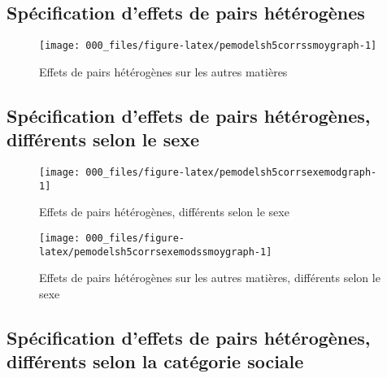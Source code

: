 \documentclass[
]{book}
\begin{document}
\hypertarget{pemodelsh5corrssmoy}{%
\subsection{Spécification d'effets de pairs hétérogènes}\label{pemodelsh5corrssmoy}}

\begin{figure}[H]

{\centering \texttt{[image: 000\_files/figure-latex/pemodelsh5corrssmoygraph-1]} 

}

\caption{Effets de pairs hétérogènes sur les autres matières}\label{fig:pemodelsh5corrssmoygraph}
\end{figure}

\newpage

\hypertarget{pemodelsh5corrsexemodssmoy}{%
\subsection{Spécification d'effets de pairs hétérogènes, différents selon le sexe}\label{pemodelsh5corrsexemodssmoy}}

\begin{figure}[H]

{\centering \texttt{[image: 000\_files/figure-latex/pemodelsh5corrsexemodgraph-1]} 

}

\caption{Effets de pairs hétérogènes, différents selon le sexe}\label{fig:pemodelsh5corrsexemodgraph}
\end{figure}

\begin{figure}[H]

{\centering \texttt{[image: 000\_files/figure-latex/pemodelsh5corrsexemodssmoygraph-1]} 

}

\caption{Effets de pairs hétérogènes sur les autres matières, différents selon le sexe}\label{fig:pemodelsh5corrsexemodssmoygraph}
\end{figure}

\newpage

\hypertarget{pemodelsh5corrpcsregmodssmoy}{%
\subsection{Spécification d'effets de pairs hétérogènes, différents selon la catégorie sociale}\label{pemodelsh5corrpcsregmodssmoy}}
\end{document}
